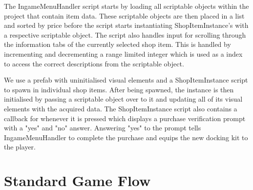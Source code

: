 The IngameMenuHandler script starts by loading all scriptable objects within the project that contain item data. These scriptable objects are then placed in a list and sorted by price before the script starts instantiating ShopItemInstance's with a respective scriptable object. 
The script also handles input for scrolling through the information tabs of the currently selected shop item. This is handled by incrementing and decrementing a range limited integer which is used as a index to access the correct descriptions from the scriptable object. 

We use a prefab with uninitialised visual elements and a ShopItemInstance script to spawn in individual shop items. After being spawned, the instance is then initialised by passing a scriptable object over to it and updating all of its visual elements with the acquired data. The ShopItemInstance script also contains a callback for whenever it is pressed which displays a purchase verification prompt with a "yes" and "no" answer. Answering "yes" to the prompt tells IngameMenuHandler to complete the purchase and equips the new docking kit to the player.  

\section{Standard Game Flow}
